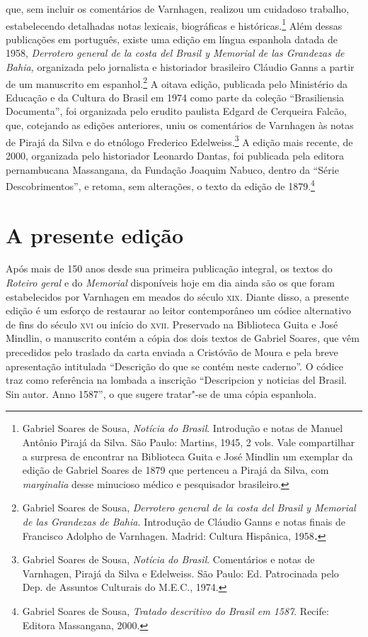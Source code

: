 que, sem incluir os comentários de Varnhagen, realizou um cuidadoso
trabalho, estabelecendo detalhadas notas lexicais, biográficas e
históricas.\footnote{ Gabriel Soares de Sousa, \textit{Notícia do
Brasil}. Introdução e notas de Manuel Antônio Pirajá da Silva. São
Paulo: Martins, 1945, 2 vols. Vale
compartilhar a surpresa de encontrar na Biblioteca Guita e José Mindlin
um exemplar da edição de Gabriel Soares de 1879 que pertenceu a Pirajá
da Silva, com \textit{marginalia} desse minucioso médico e pesquisador
brasileiro.}  Além dessas publicações em português, existe uma edição
em língua espanhola datada de 1958, \textit{Derrotero general de la
costa del Brasil y Memorial de las Grandezas de Bahia,} organizada pelo
jornalista e historiador brasileiro Cláudio Ganns a partir de um
manuscrito em espanhol.\footnote{ Gabriel Soares de
Sousa, \textit{Derrotero general de la costa del Brasil y Memorial de
las Grandezas de Bahia.} Introdução de Cláudio Ganns e notas finais de
Francisco Adolpho de Varnhagen. Madrid: Cultura Hispânica,
1958\textbf{\textit{.}}} A oitava edição, publicada pelo Ministério da
Educação e da Cultura do Brasil em 1974 como parte da coleção
“Brasiliensia Documenta”, foi organizada pelo erudito paulista Edgard
de Cerqueira Falcão, que, cotejando as edições anteriores, uniu os
comentários de Varnhagen às notas de Pirajá da Silva e do etnólogo
Frederico Edelweiss.\footnote{ Gabriel Soares de Sousa, \textit{Notícia
do Brasil}. Comentários e notas de Varnhagen, Pirajá da Silva e
Edelweiss. São Paulo: Ed. Patrocinada pelo Dep. de Assuntos Culturais
do M.E.C., 1974.} A edição mais recente, de 2000, organizada pelo
historiador Leonardo Dantas, foi publicada pela editora pernambucana
Massangana, da Fundação Joaquim Nabuco, dentro da “Série
Descobrimentos”, e retoma, sem alterações, o texto da edição de
1879.\footnote{ Gabriel Soares de Sousa, \textit{Tratado descritivo do
Brasil em 1587}. Recife: Editora Massangana, 2000.}

\section{A presente edição}

Após mais de 150 anos desde sua primeira publicação
integral, os textos do \textit{Roteiro geral} e do \textit{Memorial}
disponíveis hoje em dia ainda são os que foram estabelecidos por
Varnhagen em meados do século \textsc{xix}. Diante disso, a presente edição é um
esforço de restaurar ao leitor contemporâneo um códice alternativo de
fins do século \textsc{xvi} ou início do \textsc{xvii}. Preservado na Biblioteca Guita e
José Mindlin, o manuscrito contém a cópia dos dois textos de Gabriel
Soares\textit{,} que vêm precedidos pelo traslado da carta enviada a
Cristóvão de Moura e pela breve apresentação intitulada “Descrição do
que se contém neste caderno”.  O códice traz como referência na lombada
a inscrição “Descripcion y noticias del Brasil. Sin autor. Anno 1587”,
o que sugere tratar"-se de uma cópia espanhola.

